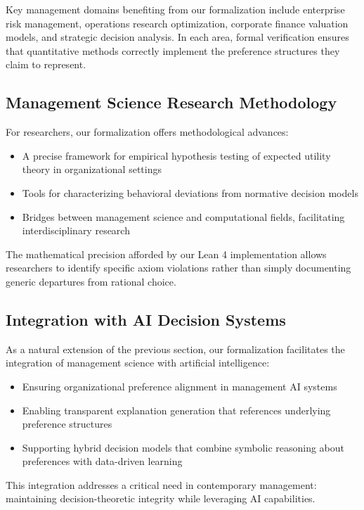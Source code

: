 \documentclass{article}
\theoremstyle{definition}
\begin{document}
Key management domains benefiting from our formalization include enterprise risk management, operations research optimization, corporate finance valuation models, and strategic decision analysis. In each area, formal verification ensures that quantitative methods correctly implement the preference structures they claim to represent.

\subsection{Management Science Research Methodology}

For researchers, our formalization offers methodological advances:

\begin{itemize}
    \item A precise framework for empirical hypothesis testing of expected utility theory in organizational settings
    \item Tools for characterizing behavioral deviations from normative decision models
    \item Bridges between management science and computational fields, facilitating interdisciplinary research
\end{itemize}

The mathematical precision afforded by our Lean 4 implementation allows researchers to identify specific axiom violations rather than simply documenting generic departures from rational choice.

\subsection{Integration with AI Decision Systems}

As a natural extension of the previous section, our formalization facilitates the integration of management science with artificial intelligence:

\begin{itemize}
    \item Ensuring organizational preference alignment in management AI systems
    \item Enabling transparent explanation generation that references underlying preference structures
    \item Supporting hybrid decision models that combine symbolic reasoning about preferences with data-driven learning
\end{itemize}

This integration addresses a critical need in contemporary management: maintaining decision-theoretic integrity while leveraging AI capabilities.
\end{document}
